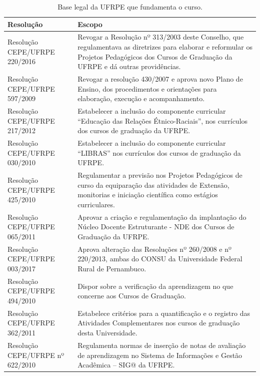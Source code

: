\documentclass[
	12pt,				%
	openright,			%
  oneside,     %
	a4paper,			%
	chapter=TITLE,		%
	english,			%
	french,				%
	spanish,			%
	brazil				%
	]{abntex2}
\begin{document}
\begin{center}
    
    \begin{scriptsize}
        \begin{longtable}{@{}lp{8.7cm}}
            \caption{\label{quadro:base-legal-ufrpe-curso}Base legal da UFRPE que fundamenta o curso.}\\
    \toprule
    \textbf{Resolução} & \textbf{Escopo} \\
    \midrule
    Resolução CEPE/UFRPE 220/2016 & Revogar a Resolução nº 313/2003 deste Conselho, que regulamentava as diretrizes para elaborar e reformular os Projetos Pedagógicos dos 	Cursos de Graduação da UFRPE e dá outras providências. \\ \midrule
    Resolução CEPE/UFRPE 597/2009 & Revogar a resolução 430/2007 e aprova novo Plano de Ensino, dos 	procedimentos e orientações para elaboração, execução e acompanhamento. \\ \midrule
    Resolução CEPE/UFRPE 217/2012 &	Estabelecer a inclusão do componente curricular ``Educação das Relações Étnico-Raciais'', nos currículos dos cursos de graduação da UFRPE. \\ \midrule
    Resolução CEPE/UFRPE 030/2010 & Estabelecer a inclusão do componente curricular ``LIBRAS'' nos 	currículos dos cursos de graduação da UFRPE. \\ \midrule
    Resolução CEPE/UFRPE 425/2010 &	Regulamentar a previsão nos Projetos Pedagógicos de curso da equiparação das atividades de Extensão, monitorias e iniciação científica como estágios curriculares. \\ \midrule
    Resolução CEPE/UFRPE 065/2011 & Aprovar a criação e regulamentação da implantação do Núcleo Docente Estruturante - NDE dos Cursos de Graduação da UFRPE. \\ \midrule
    Resolução CEPE/UFRPE 003/2017 &	Aprova alteração das Resoluções nº 260/2008 e nº 220/2013, ambas do CONSU da Universidade Federal Rural de Pernambuco. \\ \midrule
    Resolução CEPE/UFRPE 494/2010 & Dispor 	sobre a verificação da aprendizagem no que concerne aos Cursos de Graduação. \\ \midrule
    Resolução CEPE/UFRPE 362/2011 & Estabelece 	critérios para a quantificação e o registro das Atividades Complementares nos cursos de graduação desta Universidade. \\ \midrule
    Resolução CEPE/UFRPE nº 622/2010 & Regulamenta normas de inserção de notas de avaliação de aprendizagem no Sistema de Informações e Gestão Acadêmica – SIG@ da UFRPE. \\ \midrule

\end{longtable}
\end{scriptsize}
\end{center}
\end{document}
